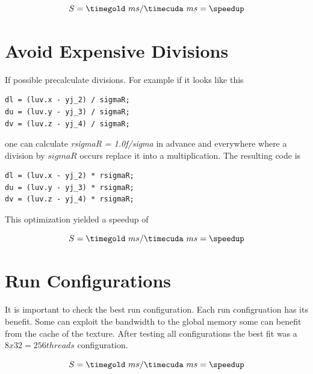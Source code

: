\fpDiv{\speedup}{\timegold}{\timecuda}
\begin{equation*}\label{eq:speedup0}
	S = \timegold\ ms/\timecuda\ ms = \speedup
\end{equation*}


\section*{Avoid Expensive Divisions}
\label{sec:expensive_divisions}

If possible precalculate divisions. For example if it looks like this
\begin{lstlisting}[caption=Divison, label=lst:division]
dl = (luv.x - yj_2) / sigmaR;               
du = (luv.y - yj_3) / sigmaR;               
dv = (luv.z - yj_4) / sigmaR;
\end{lstlisting}
one can calculate \emph{rsigmaR = 1.0f/sigma} in advance and everywhere where a division by
$sigmaR$ occurs replace it into a multiplication. The resulting code is
\begin{lstlisting}[caption=Precalculated Divison, label=lst:precalcdivision]
dl = (luv.x - yj_2) * rsigmaR;               
du = (luv.y - yj_3) * rsigmaR;               
dv = (luv.z - yj_4) * rsigmaR;
\end{lstlisting}

This optimization yielded  a speedup of 

\fpDiv{\speedup}{\timegold}{\timecuda}
\begin{equation*}\label{eq:speedup0}
	S = \timegold\ ms/\timecuda\ ms = \speedup
\end{equation*}


\section{Run Configurations} %
\label{sec:run_configurations}

It is important to check the best run configuration. Each run configruation 
has its benefit. Some can exploit the bandwidth to the global memory some can
benefit from the cache of the texture. After testing all configurations the 
best fit was a $8x32=256 threads$ configuration.

\fpDiv{\speedup}{\timegold}{\timecuda}
\begin{equation*}\label{eq:speedup0}
	S = \timegold\ ms/\timecuda\ ms = \speedup
\end{equation*}


